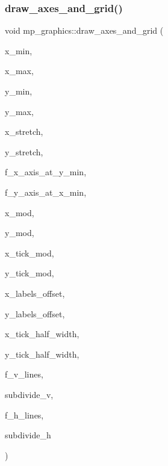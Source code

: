 \mbox{\label{classmp__graphics_a50758b934912d486ff6e5fcbef74a1d0}} 
\subsubsection{\texorpdfstring{draw\+\_\+axes\+\_\+and\+\_\+grid()}{draw\_axes\_and\_grid()}}
{\footnotesize\ttfamily void mp\+\_\+graphics\+::draw\+\_\+axes\+\_\+and\+\_\+grid (\begin{DoxyParamCaption}\item[{double}]{x\+\_\+min,  }\item[{double}]{x\+\_\+max,  }\item[{double}]{y\+\_\+min,  }\item[{double}]{y\+\_\+max,  }\item[{double}]{x\+\_\+stretch,  }\item[{double}]{y\+\_\+stretch,  }\item[{\mbox{\hyperlink{galois_8h_a09fddde158a3a20bd2dcadb609de11dc}{I\+NT}}}]{f\+\_\+x\+\_\+axis\+\_\+at\+\_\+y\+\_\+min,  }\item[{\mbox{\hyperlink{galois_8h_a09fddde158a3a20bd2dcadb609de11dc}{I\+NT}}}]{f\+\_\+y\+\_\+axis\+\_\+at\+\_\+x\+\_\+min,  }\item[{\mbox{\hyperlink{galois_8h_a09fddde158a3a20bd2dcadb609de11dc}{I\+NT}}}]{x\+\_\+mod,  }\item[{\mbox{\hyperlink{galois_8h_a09fddde158a3a20bd2dcadb609de11dc}{I\+NT}}}]{y\+\_\+mod,  }\item[{\mbox{\hyperlink{galois_8h_a09fddde158a3a20bd2dcadb609de11dc}{I\+NT}}}]{x\+\_\+tick\+\_\+mod,  }\item[{\mbox{\hyperlink{galois_8h_a09fddde158a3a20bd2dcadb609de11dc}{I\+NT}}}]{y\+\_\+tick\+\_\+mod,  }\item[{double}]{x\+\_\+labels\+\_\+offset,  }\item[{double}]{y\+\_\+labels\+\_\+offset,  }\item[{double}]{x\+\_\+tick\+\_\+half\+\_\+width,  }\item[{double}]{y\+\_\+tick\+\_\+half\+\_\+width,  }\item[{\mbox{\hyperlink{galois_8h_a09fddde158a3a20bd2dcadb609de11dc}{I\+NT}}}]{f\+\_\+v\+\_\+lines,  }\item[{\mbox{\hyperlink{galois_8h_a09fddde158a3a20bd2dcadb609de11dc}{I\+NT}}}]{subdivide\+\_\+v,  }\item[{\mbox{\hyperlink{galois_8h_a09fddde158a3a20bd2dcadb609de11dc}{I\+NT}}}]{f\+\_\+h\+\_\+lines,  }\item[{\mbox{\hyperlink{galois_8h_a09fddde158a3a20bd2dcadb609de11dc}{I\+NT}}}]{subdivide\+\_\+h }\end{DoxyParamCaption})}


